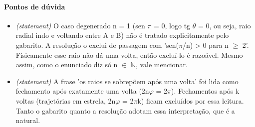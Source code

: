 \documentclass{article}%
\begin{document}
\paragraph{Pontos de dúvida}%
\begin{itemize}%
\item%
\textit{(statement)} O caso degenerado n = 1 (sen $\pi$ = 0, logo tg $\theta$ = 0, ou seja, raio radial indo e voltando entre A e B) não é tratado explicitamente pelo gabarito. A resolução o exclui de passagem com 'sen($\pi$/n) > 0 para n $\geq$ 2'. Fisicamente esse raio não dá uma volta, então excluí{-}lo é razoável. Mesmo assim, como o enunciado diz só n $\in$ $\mathbb{N}$, vale mencionar.%
\item%
\textit{(statement)} A frase 'os raios se sobrepõem após uma volta' foi lida como fechamento após exatamente uma volta (2n$\varphi$ = 2$\pi$). Fechamentos após k voltas (trajetórias em estrela, 2n$\varphi$ = 2$\pi$k) ficam excluídos por essa leitura. Tanto o gabarito quanto a resolução adotam essa interpretação, que é a natural.%
\end{itemize}%
\end{document}

